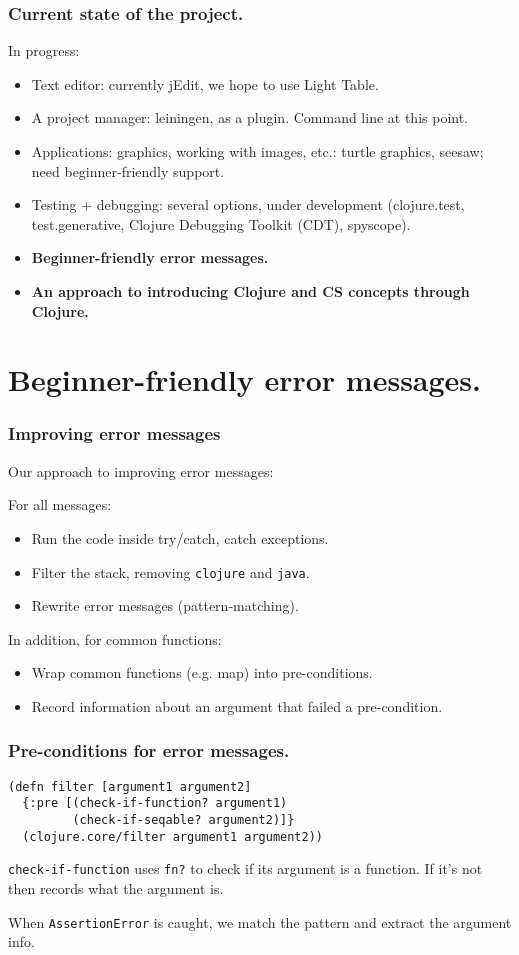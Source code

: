 \documentclass{beamer}
\begin{document}
\begin{frame}
  \frametitle{Current state of the project.}
In progress:
\begin{itemize}
\item Text editor: currently jEdit, we hope to use Light Table. 
\item A project manager: leiningen, as a plugin. Command line at this point. 
\item Applications: graphics, working with images, etc.: turtle graphics, seesaw; need beginner-friendly support.
\item Testing + debugging: several options, under development (clojure.test, test.generative, Clojure Debugging Toolkit (CDT), spyscope).
\item{\bf  Beginner-friendly error messages.}
\item {\bf An approach to introducing Clojure and CS concepts through Clojure. }
\end{itemize}
\end{frame}

\section{Beginner-friendly error messages.}

\begin{frame}
  \frametitle{Improving error messages}
Our approach to improving error messages:

For all messages:
\begin{itemize}
\item Run the code inside try/catch, catch exceptions. 
\item Filter the stack, removing {\tt clojure} and {\tt java}. 
\item Rewrite error messages (pattern-matching). 
\end{itemize}

In addition, for common functions:
\begin{itemize}
\item Wrap common functions (e.g. map) into pre-conditions. 
\item Record information about an argument that failed a pre-condition.
\end{itemize}
\end{frame}

\begin{frame}[fragile]
  \frametitle{Pre-conditions for error messages.}
\begin{verbatim}
(defn filter [argument1 argument2]
  {:pre [(check-if-function? argument1) 
         (check-if-seqable? argument2)]}
  (clojure.core/filter argument1 argument2))
\end{verbatim}
{\tt check-if-function} uses {\tt fn?} to check if its argument is a function. 
If it's not then records what the argument is. 

When {\tt AssertionError} is caught, we match the pattern and extract the argument info. 
\end{frame}
\end{document}
